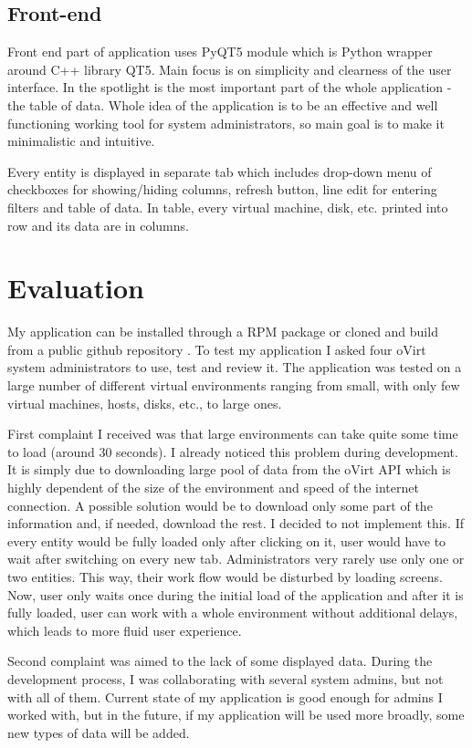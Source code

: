 \section{Front-end}
Front end part of application uses PyQT5 module which is Python wrapper around C++ library QT5. Main focus is on simplicity and clearness of the user interface. In the spotlight is the most important part of the whole application - the table of data. Whole idea of the application is to be an effective and well functioning working tool for system administrators, so main goal is to make it minimalistic and intuitive.

Every entity is displayed in separate tab which includes drop-down menu of checkboxes for showing/hiding columns, refresh button, line edit for entering filters and table of data. In table, every virtual machine, disk, etc. printed into row and its data are in columns.


\chapter{Evaluation} 
\label{chap_evaluation}
My application can be installed through a RPM package or cloned and build from a public github repository \cite{git}. To test my application I asked four oVirt system administrators to use, test and review it. The application was tested on a large number of different virtual environments ranging from small, with only few virtual machines, hosts, disks, etc., to large ones. 

First complaint I received was that large environments can take quite some time to load (around 30 seconds). I already noticed this problem during development. It is simply due to downloading large pool of data from the oVirt API which is highly dependent of the size of the environment and speed of the internet connection. A possible solution would be to download only some part of the information and, if needed, download the rest. I decided to not implement this. If every entity would be fully loaded only after clicking on it, user would have to wait after switching on every new tab. Administrators very rarely use only one or two entities. This way, their work flow would be disturbed by loading screens. Now, user only waits once during the initial load of the application and after it is fully loaded, user can work with a whole environment without additional delays, which leads to more fluid user experience. 

Second complaint was aimed to the lack of some displayed data. During the development process, I was collaborating with several system admins, but not with all of them. Current state of my application is good enough for admins I worked with, but in the future, if my application will be used more broadly, some new types of data will be added.

